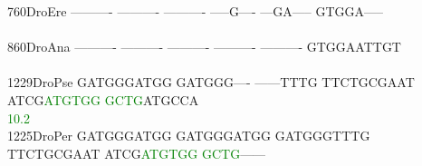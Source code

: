 \documentclass[11pt,twoside,reqno,a4paper]{article}
\begin{document}
{760\hspace*{2\charwidth}DroEre	----------	----------	----------	-----G----	---GA-----	GTGGA-----	\\
\hspace*{5\charwidth}\hspace*{7\charwidth}\hspace*{1\charwidth}\hspace*{1\charwidth}\hspace*{1\charwidth}\hspace*{1\charwidth}\hspace*{1\charwidth}\hspace*{1\charwidth}\\
860\hspace*{2\charwidth}DroAna	----------	----------	----------	----------	----------	GTGGAATTGT	\\
\hspace*{5\charwidth}\hspace*{7\charwidth}\hspace*{1\charwidth}\hspace*{1\charwidth}\hspace*{1\charwidth}\hspace*{1\charwidth}\hspace*{1\charwidth}\hspace*{1\charwidth}\\
1229\hspace*{1\charwidth}DroPse	GATGGGATGG	GATGGG----	------TTTG	TTCTGCGAAT	ATCG\textcolor{Green}{A}\textcolor{Green}{T}\textcolor{Green}{G}\textcolor{Green}{T}\textcolor{Green}{G}\textcolor{Green}{G}	\textcolor{Green}{G}\textcolor{Green}{C}\textcolor{Green}{T}\textcolor{Green}{G}ATGCCA	\\
\hspace*{5\charwidth}\hspace*{7\charwidth}\hspace*{1\charwidth}\hspace*{1\charwidth}\hspace*{1\charwidth}\hspace*{1\charwidth}\hspace*{44\charwidth}\textcolor{Green}{10.2}\hspace*{1\charwidth}\hspace*{1\charwidth}\\
1225\hspace*{1\charwidth}DroPer	GATGGGATGG	GATGGGATGG	GATGGGTTTG	TTCTGCGAAT	ATCG\textcolor{Green}{A}\textcolor{Green}{T}\textcolor{Green}{G}\textcolor{Green}{T}\textcolor{Green}{G}\textcolor{Green}{G}	\textcolor{Green}{G}\textcolor{Green}{C}\textcolor{Green}{T}\textcolor{Green}{G}------	\\
}
\end{document}
